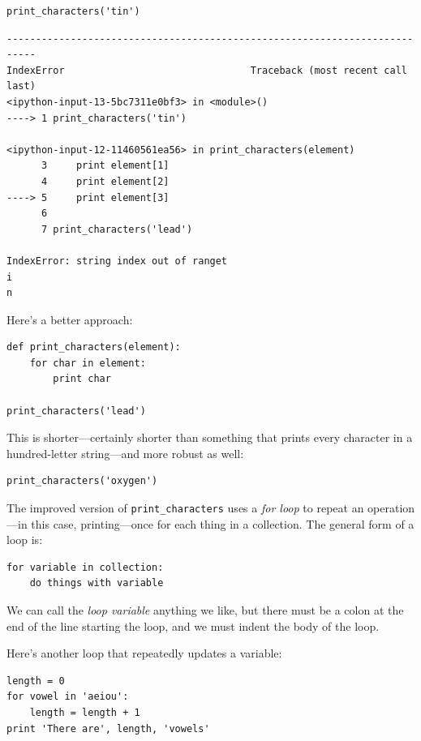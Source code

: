 \documentclass[]{book}
\newcommand{\gdef}[2]{\emph{#2}}
\begin{document}
\begin{verbatim}
print_characters('tin')
\end{verbatim}

\begin{verbatim}
---------------------------------------------------------------------------
IndexError                                Traceback (most recent call last)
<ipython-input-13-5bc7311e0bf3> in <module>()
----> 1 print_characters('tin')

<ipython-input-12-11460561ea56> in print_characters(element)
      3     print element[1]
      4     print element[2]
----> 5     print element[3]
      6
      7 print_characters('lead')

IndexError: string index out of ranget
i
n
\end{verbatim}

Here's a better approach:

\begin{verbatim}
def print_characters(element):
    for char in element:
        print char

print_characters('lead')
\end{verbatim}

This is shorter---certainly shorter than something that prints every
character in a hundred-letter string---and more robust as well:

\begin{verbatim}
print_characters('oxygen')
\end{verbatim}

The improved version of \texttt{print\_characters} uses a
\gdef{g:for-loop}{for loop} to repeat an operation---in this case,
printing---once for each thing in a collection. The general form of a
loop is:

\begin{verbatim}
for variable in collection:
    do things with variable
\end{verbatim}

We can call the \gdef{g:loop-variable}{loop variable} anything we
like, but there must be a colon at the end of the line starting the
loop, and we must indent the body of the loop.

Here's another loop that repeatedly updates a variable:

\begin{verbatim}
length = 0
for vowel in 'aeiou':
    length = length + 1
print 'There are', length, 'vowels'
\end{verbatim}
\end{document}
